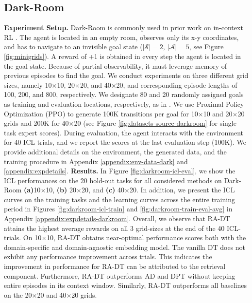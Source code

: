\documentclass{article}
\begin{document}
\subsection{Dark-Room} \label{sec:exp-darkroom}
\textbf{Experiment Setup.} Dark-Room is commonly used in prior work on in-context RL \citep{Laskin:22,Lee:23}.
The agent is located in an empty room, observes only its x-y coordinates, and has to navigate to an invisible goal state ($|\mathcal{S}|=2$, $|\mathcal{A}|=5$, see Figure \ref{fig:minigrids}).
A reward of +1 is obtained in every step the agent is located in the goal state.
Because of partial observability, it must leverage memory of previous episodes to find the goal.
We conduct experiments on three different grid sizes, namely 10$\times$10, 20$\times$20, and 40$\times$20, and corresponding episode lengths of 100, 200, and 800, respectively.
We designate 80 and 20 randomly assigned goals as training and evaluation locations, respectively, as in \citet{Lee:23}.
We use Proximal Policy Optimization (PPO) \citep{Schulman:2017} to generate 100K transitions per goal for 10$\times$10 and 20$\times$20 grids and 200K for 40$\times$20 (see Figure \ref{fig:datasets-source-darkroom} for single task expert scores).
During evaluation, the agent interacts with the environment for 40 ICL trials, and we report the scores at the last evaluation step (100K).
We provide additional details on the environment, the generated data, and the training procedure in Appendix \ref{appendix:env-data-dark} and \ref{appendix:expdetails}.
\textbf{Results.}
In Figure \ref{fig:darkroom-icl-eval}, we show the ICL performances on the 20 hold-out tasks for all considered methods on Dark-Room \textbf{(a)}10$\times$10, \textbf{(b)} 20$\times$20, and \textbf{(c)} 40$\times$20.
In addition, we present the ICL curves on the training tasks and the learning curves across the entire training period in Figures \ref{fig:darkroom-icl-train} and \ref{fig:darkroom-train-eval-avg} in Appendix \ref{appendix:expdetails-darkroom}.
Overall, we observe that RA-DT attains the highest average rewards on all 3 grid-sizes at the end of the 40 ICL-trials.
On 10$\times$10, RA-DT obtains near-optimal performance scores both with the domain-specific and domain-agnostic embedding model.
The vanilla DT does not exhibit any performance improvement across trials.
This indicates the improvement in performance for RA-DT can be attributed to the retrieval component.
Furthermore, RA-DT outperforms AD and DPT without keeping entire episodes in its context window.
Similarly, RA-DT outperforms all baselines on the 20$\times$20 and 40$\times$20 grids.
\end{document}
